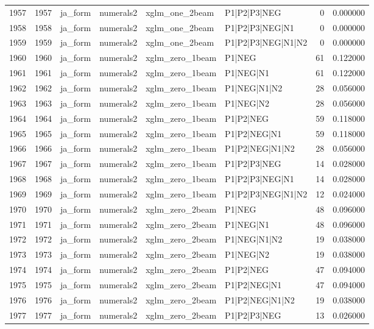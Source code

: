 \begin{tabular}{lrllllrr}
1957 & 1957 & ja_form & numerals2 & xglm_one_2beam & P1|P2|P3|NEG & 0 & 0.000000 \\
1958 & 1958 & ja_form & numerals2 & xglm_one_2beam & P1|P2|P3|NEG|N1 & 0 & 0.000000 \\
1959 & 1959 & ja_form & numerals2 & xglm_one_2beam & P1|P2|P3|NEG|N1|N2 & 0 & 0.000000 \\
1960 & 1960 & ja_form & numerals2 & xglm_zero_1beam & P1|NEG & 61 & 0.122000 \\
1961 & 1961 & ja_form & numerals2 & xglm_zero_1beam & P1|NEG|N1 & 61 & 0.122000 \\
1962 & 1962 & ja_form & numerals2 & xglm_zero_1beam & P1|NEG|N1|N2 & 28 & 0.056000 \\
1963 & 1963 & ja_form & numerals2 & xglm_zero_1beam & P1|NEG|N2 & 28 & 0.056000 \\
1964 & 1964 & ja_form & numerals2 & xglm_zero_1beam & P1|P2|NEG & 59 & 0.118000 \\
1965 & 1965 & ja_form & numerals2 & xglm_zero_1beam & P1|P2|NEG|N1 & 59 & 0.118000 \\
1966 & 1966 & ja_form & numerals2 & xglm_zero_1beam & P1|P2|NEG|N1|N2 & 28 & 0.056000 \\
1967 & 1967 & ja_form & numerals2 & xglm_zero_1beam & P1|P2|P3|NEG & 14 & 0.028000 \\
1968 & 1968 & ja_form & numerals2 & xglm_zero_1beam & P1|P2|P3|NEG|N1 & 14 & 0.028000 \\
1969 & 1969 & ja_form & numerals2 & xglm_zero_1beam & P1|P2|P3|NEG|N1|N2 & 12 & 0.024000 \\
1970 & 1970 & ja_form & numerals2 & xglm_zero_2beam & P1|NEG & 48 & 0.096000 \\
1971 & 1971 & ja_form & numerals2 & xglm_zero_2beam & P1|NEG|N1 & 48 & 0.096000 \\
1972 & 1972 & ja_form & numerals2 & xglm_zero_2beam & P1|NEG|N1|N2 & 19 & 0.038000 \\
1973 & 1973 & ja_form & numerals2 & xglm_zero_2beam & P1|NEG|N2 & 19 & 0.038000 \\
1974 & 1974 & ja_form & numerals2 & xglm_zero_2beam & P1|P2|NEG & 47 & 0.094000 \\
1975 & 1975 & ja_form & numerals2 & xglm_zero_2beam & P1|P2|NEG|N1 & 47 & 0.094000 \\
1976 & 1976 & ja_form & numerals2 & xglm_zero_2beam & P1|P2|NEG|N1|N2 & 19 & 0.038000 \\
1977 & 1977 & ja_form & numerals2 & xglm_zero_2beam & P1|P2|P3|NEG & 13 & 0.026000 \\

\end{tabular}
